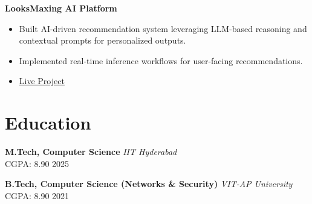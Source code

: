 \documentclass[10pt,a4paper]{article}
\newcommand{\resumeItem}[1]{\item\small{#1}}
\begin{document}
\vspace{4pt}

\textbf{LooksMaxing AI Platform}
\begin{itemize}[leftmargin=*,noitemsep]
    \resumeItem{Built AI-driven recommendation system leveraging LLM-based reasoning and contextual prompts for personalized outputs.}
    \resumeItem{Implemented real-time inference workflows for user-facing recommendations.}
    \resumeItem{\href{https://www.looksmaxxing.in/}{Live Project}}
\end{itemize}

\vspace{4pt}

\section{Education}

\textbf{M.Tech, Computer Science} \hfill \textit{IIT Hyderabad} \\
CGPA: 8.90 \hfill 2025

\vspace{2pt}

\textbf{B.Tech, Computer Science (Networks \& Security)} \hfill \textit{VIT-AP University} \\
CGPA: 8.90 \hfill 2021
\end{document}
